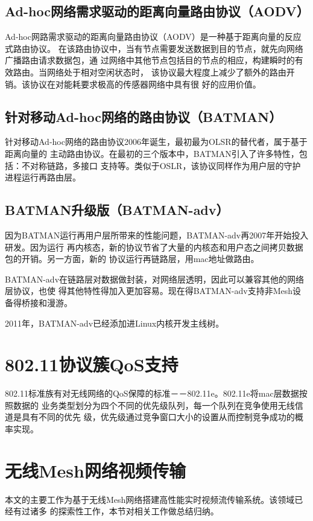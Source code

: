 \subsection{Ad-hoc网络需求驱动的距离向量路由协议（AODV）}
Ad-hoc网路需求驱动的距离向量路由协议（AODV）是一种基于距离向量的反应式路由协议。
在该路由协议中，当有节点需要发送数据到目的节点，就先向网络广播路由请求数据包，通
过网络中其他节点包括目的节点的相应，构建瞬时的有效路由。当网络处于相对空闲状态时，
该协议最大程度上减少了额外的路由开销。该协议在对能耗要求极高的传感器网络中具有很
好的应用价值。

\subsection{针对移动Ad-hoc网络的路由协议（BATMAN）}
针对移动Ad-hoc网络的路由协议2006年诞生，最初最为OLSR的替代者，属于基于距离向量的
主动路由协议。在最初的三个版本中，BATMAN引入了许多特性，包括：不对称链路，多接口
支持等。类似于OSLR，该协议同样作为用户层的守护进程运行再路由层。

\subsection{BATMAN升级版（BATMAN-adv）}
因为BATMAN运行再用户层所带来的性能问题，BATMAN-adv再2007年开始投入研发。因为运行
再内核态，新的协议节省了大量的内核态和用户态之间拷贝数据包的开销。另一方面，新的
协议运行再链路层，用mac地址做路由。

BATMAN-adv在链路层对数据做封装，对网络层透明，因此可以兼容其他的网络层协议，也使
得其他特性得加入更加容易。现在得BATMAN-adv支持非Mesh设备得桥接和漫游。

2011年，BATMAN-adv已经添加进Linux内核开发主线树。

\section{802.11协议簇QoS支持}
802.11标准族有对无线网络的QoS保障的标准－－802.11e。802.11e将mac层数据按照数据的
业务类型划分为四个不同的优先级队列，每一个队列在竞争使用无线信道是具有不同的优先
级，优先级通过竞争窗口大小的设置从而控制竞争成功的概率实现。

\section{无线Mesh网络视频传输}
本文的主要工作为基于无线Mesh网络搭建高性能实时视频流传输系统。该领域已经有过诸多
的探索性工作，本节对相关工作做总结归纳。

